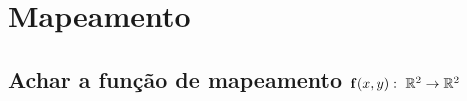 
\chapter{Mapeamento}

\section{ Achar a função de mapeamento $\VECTOR{f}(x,y):~\mathbb{R}^2 \rightarrow \mathbb{R}^2$ }



